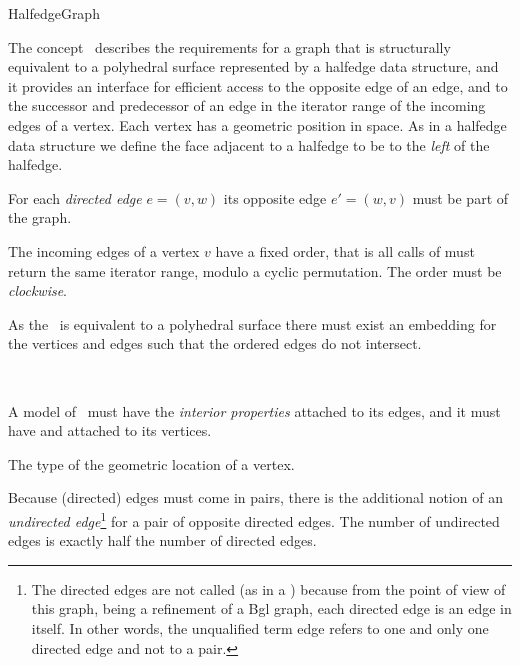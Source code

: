 
\begin{ccRefConcept}{HalfedgeGraph}


\ccDefinition

The concept \ccRefName\ describes the requirements for a graph that is
structurally equivalent to a polyhedral surface represented by a
halfedge data structure, and it provides an interface for efficient
access to the opposite edge of an edge, and to the successor and
predecessor of an edge in the iterator range of the incoming edges of
a vertex.  Each vertex has a geometric position in space. As in a
halfedge data structure we define the face adjacent to a halfedge to be
to the {\em left} of the halfedge.



For each {\em directed edge} $e=(v,w)$ its opposite edge $e'=(w,v)$
must be part of the graph.

The incoming edges of a vertex $v$ have a fixed order, that is all
calls of  must return the same iterator range,
modulo a cyclic permutation. The order must be {\em clockwise}.

As the \ccRefName\ is equivalent to a polyhedral surface there must exist an embedding
for the vertices and edges such that the ordered edges do not intersect.


\ccRefines
{}\\

A model of \ccRefName\ must have the {\em interior properties} 
 attached to its edges,
and it must have  and  attached to its vertices.






{The type of the geometric location of a vertex.}


Because (directed) edges must come in pairs, there is the additional
notion of an {\em undirected edge}\footnote{
The directed edges are not called  (as in a
) because from the point of view of this graph, being
a refinement of a {\sc Bgl} graph, each directed edge is an
edge in itself. In other words, the unqualified term edge
refers to one and only one directed edge and not to a pair.}
% 
for a pair of opposite directed edges.
The number of undirected edges is exactly half the number of directed edges.


\end{ccRefConcept}
